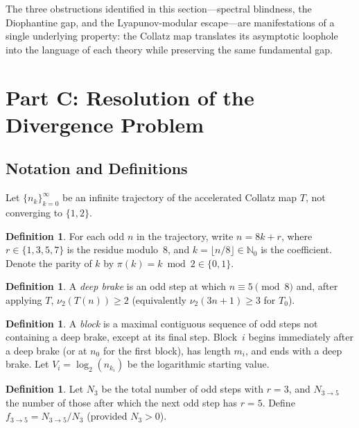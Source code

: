 \documentclass[12pt,a4paper]{article}
\theoremstyle{definition}
\newtheorem{definition}[theorem]{Definition}
\theoremstyle{remark}
\begin{document}
The three obstructions identified in this section---spectral blindness,
the Diophantine gap, and the Lyapunov-modular escape---are
manifestations of a single underlying property: the Collatz map
translates its asymptotic loophole into the language of each theory
while preserving the same fundamental gap.

\section{Part C: Resolution of the Divergence Problem}

\subsection{Notation and Definitions}

Let $\{n_k\}_{k=0}^\infty$ be an infinite trajectory of the accelerated
Collatz map $T$, not converging to $\{1,2\}$.

\begin{definition}\label{def:residue}
For each odd $n$ in the trajectory, write $n=8k+r$, where
$r\in\{1,3,5,7\}$ is the residue modulo~$8$, and
$k=\lfloor n/8\rfloor\in\mathbb N_0$ is the coefficient.
Denote the parity of $k$ by $\pi(k)=k\bmod2\in\{0,1\}$.
\end{definition}

\begin{definition}\label{def:deepbrake}
A \emph{deep brake} is an odd step at which $n\equiv5\pmod8$ and,
after applying $T$, $\nu_2(T(n))\ge2$
(equivalently $\nu_2(3n+1)\ge3$ for $T_0$).
\end{definition}

\begin{definition}\label{def:block}
A \emph{block} is a maximal contiguous sequence of odd steps not
containing a deep brake, except at its final step.
Block~$i$ begins immediately after a deep brake (or at $n_0$ for the
first block), has length $m_i$, and ends with a deep brake.
Let $V_i=\log_2(n_{k_i})$ be the logarithmic starting value.
\end{definition}

\begin{definition}\label{def:f35}
Let $N_3$ be the total number of odd steps with $r=3$, and $N_{3\to5}$
the number of those after which the next odd step has $r=5$.
Define $f_{3\to5}=N_{3\to5}/N_3$ (provided $N_3>0$).
\end{definition}
\end{document}
